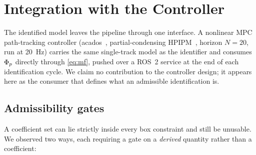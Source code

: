 \section{Integration with the Controller}
\label{sec:integration}

The identified model leaves the pipeline through one interface. A nonlinear MPC
path-tracking controller (acados~\cite{acados2022}, partial-condensing
HPIPM~\cite{hpipm2020}, horizon $N=20$, run at \SI{20}{\hertz})
carries the same single-track model as the identifier and consumes $\Phi_{p}$
directly through \eqref{eq:mf}, pushed over a ROS~2 service at the end of each
identification cycle. We claim no contribution to the controller design; it
appears here as the consumer that defines what an admissible identification is.

\subsection{Admissibility gates}
\label{subsec:gates}

A coefficient set can lie strictly inside every box constraint and still be
unusable. We observed two ways, each requiring a gate on a \emph{derived}
quantity rather than a coefficient:

